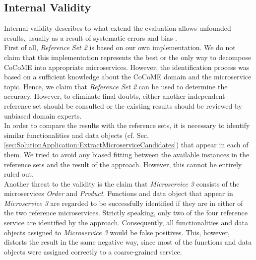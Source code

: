 \subsection{Internal Validity}
Internal validity describes to what extend the evaluation allows unfounded results, usually as a result of systematic errors and bias \cite{Validity}. \\
First of all, \textit{Reference Set 2} is based on our own implementation. We do not claim that this implementation represents the best or the only way to decompose CoCoME into appropriate microservices. However, the identification process was based on a sufficient knowledge about the CoCoME domain and the microservice topic. Hence, we claim that \textit{Reference Set 2} can be used to determine the accuracy. However, to eliminate final doubts, either another independent reference set should be consulted or the existing results should be reviewed by unbiased domain experts. \\
In order to compare the results with the reference sets, it is necessary to identify similar functionalities and data objects (cf. Sec.\ref{sec:SolutionApplication:ExtractMicroserviceCandidates}) that appear in each of them. We tried to avoid any biased fitting between the available instances in the reference sets and the result of the approach. However, this cannot be entirely ruled out.\\
Another threat to the validity is the claim that \textit{Microservice 3} consists of the microservices \textit{Order} and \textit{Product}. Functions and data object that appear in \textit{Microservice 3} are regarded to be successfully identified if they are in either of the two reference microservices. Strictly speaking, only two of the four reference service are identified by the approach. Consequently, all functionalities and data objects assigned to \textit{Microservice 3} would be false positives. This, however, distorts the result in the same negative way, since most of the functions and data objects were assigned correctly to a coarse-grained service.




